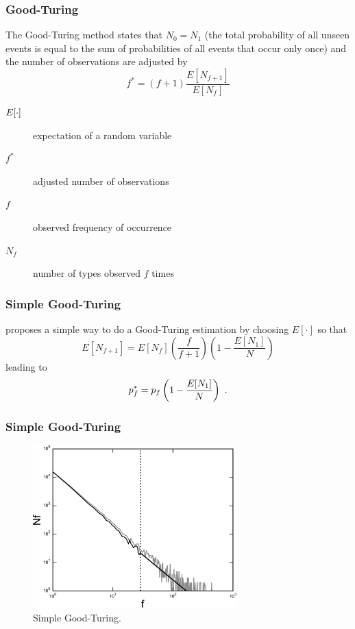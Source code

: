 \documentclass[notes]{beamer}
\begin{document}
\frame
{
  \frametitle{Good-Turing}
  The Good-Turing method states that
  $N_0 = N_1$ (the total probability of all unseen events is 
  equal to the sum of probabilities of all events that occur only once) and
  the number of observations are adjusted by
  \begin{equation}
  \label{eq:goodturingnormnum}
  f^\ast = (f + 1) \frac{E[N_{f+1}]}{E[N_f]}
  \end{equation}
  
  \begin{description}
  \item[$E\symbol{91} \cdot \symbol{93}$] expectation of a random variable
  \item[$f^\ast$] adjusted number of observations
  \item[$f$] observed frequency of occurrence 
  \item[$N_f$] number of types observed $f$ times
  \end{description}
}


\frame
{
  \frametitle{Simple Good-Turing}
  \cite{galesampson95} proposes a simple way to do a Good-Turing estimation by choosing $E[\cdot]$ so that
  \begin{equation}
  \label{eq:goodturingestimator}
  E[N_{f+1}] = E[N_f] \left( \frac{f}{f+1} \right) \left( 1 - \frac{E[N_1]}{N} \right)
  \end{equation}
  leading to
  \begin{equation}
  p^\ast_f = p_f \left( 1 - \frac{E[N_1]}{N} \right) \textmd{ .}
  \end{equation} 
}

\frame
{
  \frametitle{Simple Good-Turing}

  \begin{figure}[h!]
  \centering
  \includegraphics[width=0.70\textwidth]{images/inverse_zipf_sgt.pdf}
  \caption{Simple Good-Turing.}
  \label{fig:inverse_zipf_sgt}
  \end{figure}
}
\end{document}
